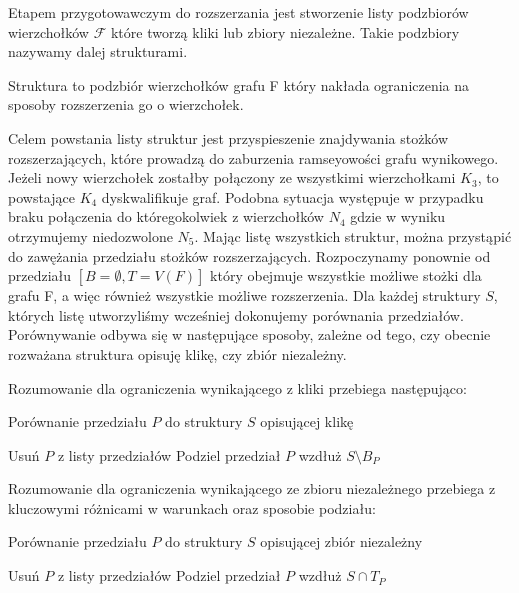 Etapem przygotowawczym do rozszerzania jest stworzenie listy podzbiorów wierzchołków $\mathcal{F}$ które tworzą kliki lub zbiory niezależne. Takie podzbiory nazywamy dalej strukturami.

\begin{definition} Struktura to podzbiór wierzchołków grafu F który nakłada ograniczenia na sposoby rozszerzenia go o wierzchołek.
\end{definition}

Celem powstania listy struktur jest przyspieszenie znajdywania stożków rozszerzających, które prowadzą do zaburzenia ramseyowości grafu wynikowego. Jeżeli nowy wierzchołek zostałby połączony ze wszystkimi wierzchołkami $K_3$, to powstające $K_4$ dyskwalifikuje graf. Podobna sytuacja występuje w przypadku braku połączenia do któregokolwiek z wierzchołków $N_4$ gdzie w wyniku otrzymujemy niedozwolone $N_5$. 
Mając listę wszystkich struktur, można przystąpić do zawężania przedziału stożków rozszerzających. Rozpoczynamy ponownie od przedziału $[B = \emptyset, T = V(F) ]$ który obejmuje wszystkie możliwe stożki dla grafu F, a więc również wszystkie możliwe rozszerzenia. Dla każdej struktury $S$, których listę utworzyliśmy wcześniej dokonujemy porównania przedziałów. Porównywanie odbywa się w następujące sposoby, zależne od tego, czy obecnie rozważana struktura opisuję klikę, czy zbiór niezależny.

Rozumowanie dla ograniczenia wynikającego z kliki przebiega następująco:
\begin{algorithm}[H]
  \caption{Porównanie przedziału $P$ do struktury $S$ opisującej klikę}
  \begin{algorithmic}
	  \STATE Usuń $P$ z listy przedziałów
	\ELSE
	  \STATE Podziel przedział $P$ wzdłuż $S \setminus B_P  $
  	\ENDIF
  \ENDIF  
  \end{algorithmic}
\end{algorithm}

Rozumowanie dla ograniczenia wynikającego ze zbioru niezależnego przebiega z kluczowymi różnicami w warunkach oraz sposobie podziału:

\begin{algorithm}[H]
  \caption{Porównanie przedziału $P$ do struktury $S$ opisującej zbiór niezależny}
  \begin{algorithmic}
	  \STATE Usuń $P$ z listy przedziałów
	\ELSE
	  \STATE Podziel przedział $P$ wzdłuż $S \cap T_P  $
  	\ENDIF
  \ENDIF  
  \end{algorithmic}
\end{algorithm}

